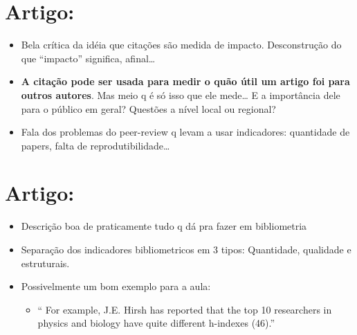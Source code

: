 \documentclass[11pt]{article}
\begin{document}
\section{Artigo: \cite{belter2015}}
\label{sec:orga504b43}
\begin{itemize}
\item Bela crítica da idéia que citações são medida de impacto. Desconstrução do que ``impacto'' significa, afinal\ldots{}
\item \textbf{A citação pode ser usada para medir o quão útil um artigo foi para outros autores}. Mas meio q é só isso que ele mede\ldots{} E a importância dele para o público em geral? Questões a nível local ou regional?
\item Fala dos problemas do peer-review q levam a usar indicadores: quantidade de papers, falta de reprodutibilidade\ldots{}
\end{itemize}

\section{Artigo: \cite{durieux2010}}
\label{sec:org2616529}
\begin{itemize}
\item Descrição boa de praticamente tudo q dá pra fazer em bibliometria
\item Separação dos indicadores bibliometricos em 3 tipos: Quantidade, qualidade e estruturais.
\item Possivelmente um bom exemplo para a aula:
\begin{itemize}
\item `` For example, J.E. Hirsh has reported that the top 10 researchers in physics and biology have quite different h-indexes (46).''
\end{itemize}
\end{itemize}
\end{document}
